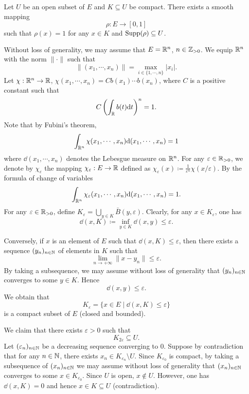 \begin{propositionenv}
    Let $U$ be an open subset of $E$ and $K \subseteq U$ be compact.
    There exists a smooth mapping
    $$\rho : E \longrightarrow [0,1]$$
    such that $\rho(x) = 1$ for any $x \in K$ and $\operatorname{\mathrm{Supp}}(\rho) \subseteq U$.
\end{propositionenv}
\begin{proofenv}
    Without loss of generality, we may assume that $E = \mathbb{R}^n$, $n \in \mathbb{Z}_{>0}$.
    We equip $\mathbb{R}^n$ with the norm $\|\cdot\|$ such that
    $$\|(x_1,\cdots,x_n)\| = \max_{i \in \{1,\cdots,n\}} |x_i|.$$
    Let $\chi : \mathbb{R}^n \rightarrow \mathbb{R}$, $\chi(x_1,\cdots,x_n) = C b(x_1) \cdots b(x_n)$,
    where $C$ is a positive constant such that
    $$C\left(\int_{\mathbb{R}} b(t) \mathrm{d} t\right)^n = 1.$$
    Note that by Fubini's theorem,
    $$\int_{\mathbb{R}^n} \chi(x_1,\cdots,x_n)\mathrm{d}(x_1,\cdots,x_n) = 1$$
    where $\dd (x_1,\cdots,x_n)$ denotes the Lebesgue measure on $\mathbb{R}^n$.
    For any $\varepsilon \in \mathbb{R}_{>0}$, we denote by $\chi_{\varepsilon}$ the mapping
    $\chi_{\varepsilon} : E \rightarrow \mathbb{R}$ defined as $\chi_{\varepsilon}(x) \coloneq \frac{1}{\varepsilon^n} \chi(x/\varepsilon)$.
    By the formula of change of variables
    $$\int_{\mathbb{R}^n} \chi_{\varepsilon}(x_1,\cdots,x_n) \mathrm{d}(x_1,\cdots,x_n) = 1.$$
    For any $\varepsilon \in \mathbb{R}_{>0}$, define $K_{\varepsilon} = \bigcup_{y \in K}\bar{B}(y,\varepsilon)$.
    Clearly, for any $x \in K_{\varepsilon}$, one has
    $$\dd(x,K) \coloneq \inf_{y \in K} \dd(x,y) \le \varepsilon.$$

    \quad Conversely, if $x$ is an element of $E$ such that $\dd(x,K)\le \varepsilon$, then there exists a sequence $(y_n)_{n \in \mathbb{N}}$ of elements in $K$ such that
    $$\lim_{n\rightarrow +\infty}\|x - y_n\|\le \varepsilon.$$
    By taking a subsequence, we may assume without loss of generality that $(y_n)_{n \in \mathbb{N}}$ converges to some $y \in K$.
    Hence
    $$\dd(x,y) \le \varepsilon.$$
    We obtain that
    $$K_{\varepsilon} = \{x \in E \mid \dd(x,K) \le \varepsilon\}$$
    is a compact subset of $E$ (closed and bounded).
    
    \quad We claim that there exists $\varepsilon > 0$ such that
    $$K_{2\varepsilon} \subseteq U.$$
    Let $(\varepsilon_n)_{n \in \mathbb{N}}$ be a decreasing sequence converging to $0$.
    Suppose by contradiction that for any $n \in \mathbb{N}$, there exists $x_n \in K_{\varepsilon_n} \setminus U$.
    Since $K_{\varepsilon_0}$ is compact,
    by taking a subsequence of $(x_n)_{n \in \mathbb{N}}$ we may assume without loss of generality that $(x_n)_{n \in \mathbb{N}}$ converges to some $x \in K_{\varepsilon_0}$.
    Since $U$ is open, $x \notin U$.
    However, one has $\dd(x,K) = 0$ and hence $x \in K \subseteq U$ (contradiction).
    

\end{proofenv}
